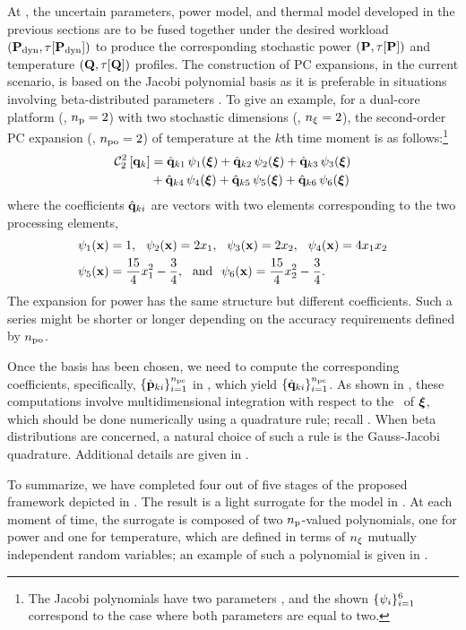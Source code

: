 At , the uncertain parameters, power model, and thermal model developed in the previous sections are to be fused together under the desired workload $\profilePdyn$ to produce the corresponding stochastic power $\profileP$ and temperature $\profileT$ profiles.
The construction of PC expansions, in the current scenario, is based on the Jacobi polynomial basis as it is preferable in situations involving beta-distributed parameters \cite{xiu2010}.
To give an example, for a dual-core platform (\ie, ${n_\text{p}} = 2$) with two stochastic dimensions (\ie, ${n_\xi} = 2$), the second-order PC expansion (\ie, ${n_\text{po}} = 2$) of temperature at the $k$th time moment is as follows:\footnote{The Jacobi polynomials have two parameters \cite{xiu2010}, and the shown $\{ \psi_i \}_{i = 1}^6$ correspond to the case where both parameters are equal to two.}
\begin{align}
  \oPC{2}{2}{\vTO_k} &= \pcc{\vTO}_{k1} \, \pcb_1(\vZ) + \pcc{\vTO}_{k2} \, \pcb_2(\vZ) + \pcc{\vTO}_{k3} \, \pcb_3(\vZ) \nonumber \\
  & {} + \pcc{\vTO}_{k4} \, \pcb_4(\vZ) + \pcc{\vTO}_{k5} \, \pcb_5(\vZ) + \pcc{\vTO}_{k6} \, \pcb_6(\vZ) \elabel{pc-example}
\end{align}
where the coefficients $\hat{\mathbf{q}}_{ki}$ are vectors with two elements corresponding to the two processing elements,
\begin{align*}
  & \psi_1(\mathbf{x}) = 1, \hspace{0.7em} \psi_2(\mathbf{x}) = 2 x_1, \hspace{0.7em} \psi_3(\mathbf{x}) = 2 x_2, \hspace{0.7em} \psi_4(\mathbf{x}) = 4 x_1 x_2 \\
  & \psi_5(\mathbf{x}) = \frac{15}{4} x_1^2 - \frac{3}{4}, \hspace{0.7em} \text{and} \hspace{0.7em} \psi_6(\mathbf{x}) = \frac{15}{4} x_2^2 - \frac{3}{4}.
\end{align*}
The expansion for power has the same structure but different coefficients.
Such a series might be shorter or longer depending on the accuracy requirements defined by ${n_\text{po}}$.

Once the basis has been chosen, we need to compute the corresponding coefficients, specifically, $\{ \hat{\mathbf{p}}_{ki} \}_{i = 1}^{n_\text{pc}}$ in , which yield $\{ \hat{\mathbf{q}}_{ki} \}_{i = 1}^{n_\text{pc}}$.
As shown in , these computations involve multidimensional integration with respect to the \pdf\ of $\boldsymbol{\xi}$, which should be done numerically using a quadrature rule; recall .
When beta distributions are concerned, a natural choice of such a rule is the Gauss-Jacobi quadrature.
Additional details are given in .

To summarize, we have completed four out of five stages of the proposed framework depicted in .
The result is a light surrogate for the model in .
At each moment of time, the surrogate is composed of two ${n_\text{p}}$-valued polynomials, one for power and one for temperature, which are defined in terms of ${n_\xi}$ mutually independent random variables; an example of such a polynomial is given in .
